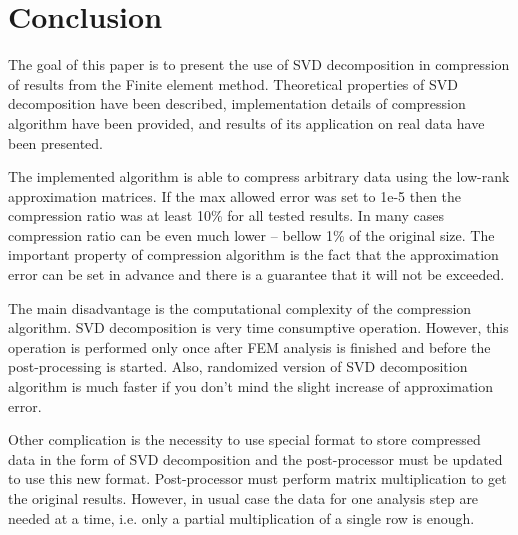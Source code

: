 \section{Conclusion}
\label{sec:conclusion}

The goal of this paper is to present the use of SVD decomposition in compression of results from the Finite element method. Theoretical properties of SVD decomposition have been described, implementation details of compression algorithm have been provided, and results of its application on real data have been presented.

The implemented algorithm is able to compress arbitrary data using the low-rank approximation matrices. If the max allowed error was set to 1e-5 then the compression ratio was at least 10\% for all tested results. In many cases compression ratio can be even much lower -- bellow 1\% of the original size. The important property of compression algorithm is the fact that the approximation error can be set in advance and there is a guarantee that it will not be exceeded.

The main disadvantage is the computational complexity of the compression algorithm. SVD decomposition is very time consumptive operation. However, this operation is performed only once after FEM analysis is finished and before the post-processing is started. Also, randomized version of SVD decomposition algorithm is much faster if you don't mind the slight increase of approximation error. %

Other complication is the necessity to use special format to store compressed data in the form of SVD decomposition and the post-processor must be updated to use this new format. Post-processor must perform matrix multiplication to get the original results. However, in usual case the data for one analysis step are needed at a time, i.e. only a partial multiplication of a single row is enough.


